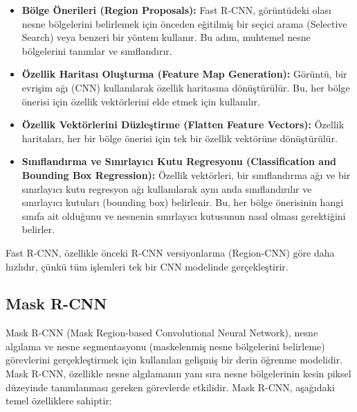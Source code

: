 \begin{itemize}
    \item \textbf{Bölge Önerileri (Region Proposals):} Fast R-CNN, görüntüdeki olası nesne bölgelerini belirlemek için önceden eğitilmiş bir seçici arama (Selective Search) veya benzeri bir yöntem kullanır. Bu adım, muhtemel nesne bölgelerini tanımlar ve sınıflandırır.
    \item \textbf{Özellik Haritası Oluşturma (Feature Map Generation):} Görüntü, bir evrişim ağı (CNN) kullanılarak özellik haritasına dönüştürülür. Bu, her bölge önerisi için özellik vektörlerini elde etmek için kullanılır.
    \item \textbf{Özellik Vektörlerini Düzleştirme (Flatten Feature Vectors):} Özellik haritaları, her bir bölge önerisi için tek bir özellik vektörüne dönüştürülür.
    \item \textbf{Sınıflandırma ve Sınırlayıcı Kutu Regresyonu (Classification and Bounding Box Regression):} Özellik vektörleri, bir sınıflandırma ağı ve bir sınırlayıcı kutu regresyon ağı kullanılarak aynı anda sınıflandırılır ve sınırlayıcı kutuları (bounding box) belirlenir. Bu, her bölge önerisinin hangi sınıfa ait olduğunu ve nesnenin sınırlayıcı kutusunun nasıl olması gerektiğini belirler.
\end{itemize}

Fast R-CNN, özellikle önceki R-CNN versiyonlarına (Region-CNN) göre daha hızlıdır, çünkü tüm işlemleri tek bir CNN modelinde gerçekleştirir.

\subsection{Mask R-CNN}
Mask R-CNN (Mask Region-based Convolutional Neural Network), nesne algılama ve nesne segmentasyonu (maskelenmiş nesne bölgelerini belirleme) görevlerini gerçekleştirmek için kullanılan gelişmiş bir derin öğrenme modelidir. Mask R-CNN, özellikle nesne algılamanın yanı sıra nesne bölgelerinin kesin piksel düzeyinde tanımlanması gereken görevlerde etkilidir. Mask R-CNN, aşağıdaki temel özelliklere sahiptir:

